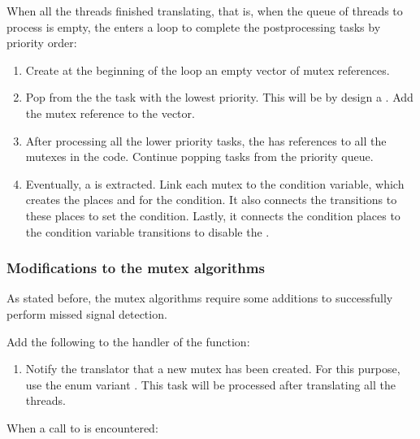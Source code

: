 When all the threads finished translating, that is,
when the queue of threads to process is empty,
the  enters a loop
to complete the postprocessing tasks by priority order:

\begin{enumerate}
      \item Create at the beginning of the loop an empty vector of mutex references.
      \item Pop from the  the task with the lowest priority.
            This will be by design a .
            Add the mutex reference to the vector.
      \item After processing all the lower priority tasks,
            the  has references to all the mutexes in the code.
            Continue popping tasks from the priority queue.
      \item Eventually, a  is extracted.
            Link each mutex to the condition variable,
            which creates the places 
            and  for the condition.
            It also connects the  transitions
            to these places to set the condition.
            Lastly, it connects the condition places to the condition variable transitions
            to disable the .
\end{enumerate}

\subsubsection{Modifications to the mutex algorithms}

As stated before, the mutex algorithms require some additions to successfully
perform missed signal detection.

Add the following to the handler of the  function:

\begin{enumerate}
      \item Notify the translator that a new mutex has been created.
            For this purpose, use the enum variant .
            This task will be processed after translating all the threads.
\end{enumerate}

When a call to  is encountered:

